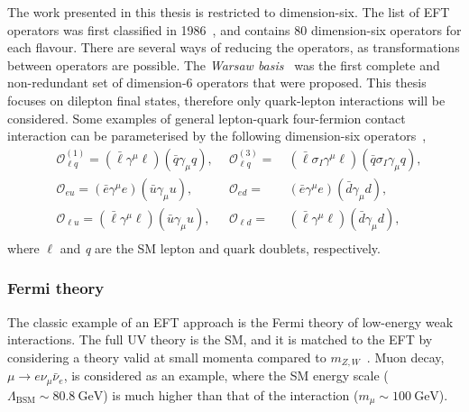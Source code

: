 The work presented in this thesis is restricted to dimension-six. The list of EFT operators was first classified in 1986~\cite{Buchmuller:163116}, and contains 80 dimension-six operators for each flavour. There are several ways of reducing the operators, as transformations between operators are possible. The \emph{Warsaw basis}~\cite{Grzadkowski_2010} was the first complete and non-redundant set of dimension-6 operators that were proposed. This thesis focuses on dilepton final states, therefore only quark-lepton interactions will be considered. Some examples of general lepton-quark four-fermion contact interaction can be parameterised by the following dimension-six operators~\cite{de_Blas_2013},
\begin{equation}
    \label{eq:CIop}
    \begin{aligned}
        & \mathcal{O}^{(1)}_{\ell q} = (\bar{\ell}\gamma^\mu \ell)(\bar{q}\gamma_\mu q),~~ &\mathcal{O}^{(3)}_{\ell q} =& ~(\bar{\ell}\sigma_I\gamma^\mu \ell)(\bar{q}\sigma_I\gamma_\mu q), \\
        & \mathcal{O}_{eu} = (\bar{e}\gamma^\mu e)(\bar{u}\gamma_\mu u),~~ &\mathcal{O}_{e d} =& ~(\bar{e}\gamma^\mu e)(\bar{d}\gamma_\mu d), \\
        & \mathcal{O}_{\ell u} = (\bar{\ell}\gamma^\mu \ell)(\bar{u}\gamma_\mu u),~~ &\mathcal{O}_{\ell d} =& ~(\bar{\ell}\gamma^\mu \ell)(\bar{d}\gamma_\mu d), \\
     \end{aligned}
\end{equation}
where $\ell$ and  \emph{q} are the SM lepton and quark doublets, respectively.


\subsubsection{Fermi theory}
The classic example of an EFT approach is the Fermi theory of low-energy weak interactions. The full UV theory is the SM, and it is matched to the EFT by considering a theory valid at small momenta compared to $m_{Z,W}$~\cite{Manohar:2018aog}. Muon decay, $\mu \rightarrow e\nu_\mu\bar{\nu}_e$, is considered as an example, where the SM energy scale ($\Lambda_{\mathrm{BSM}}\sim\SI{80.8}{\giga\electronvolt}$) is much higher than that of the interaction ($m_\mu \sim \SI{100}{\giga\electronvolt}$). 

